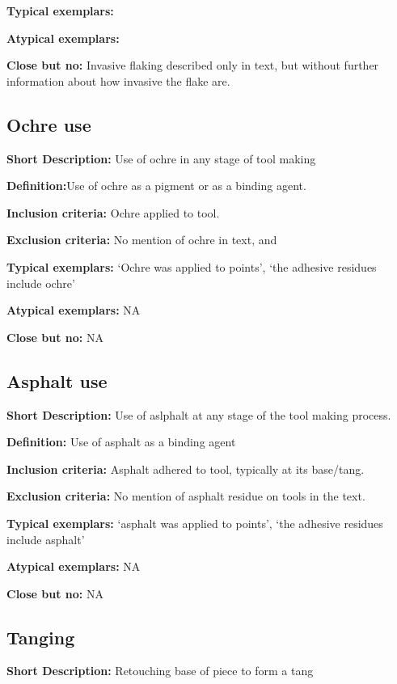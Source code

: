 \documentclass[
]{article}
\begin{document}
\textbf{Typical exemplars:}

\textbf{Atypical exemplars:}

\textbf{Close but no:} Invasive flaking described only in text, but
without further information about how invasive the flake are.

\hypertarget{ochre-use}{%
\subsection{Ochre use}\label{ochre-use}}

\textbf{Short Description:} Use of ochre in any stage of tool making

\textbf{Definition:}Use of ochre as a pigment or as a binding agent.

\textbf{Inclusion criteria:} Ochre applied to tool.

\textbf{Exclusion criteria:} No mention of ochre in text, and

\textbf{Typical exemplars:} `Ochre was applied to points', `the adhesive
residues include ochre'

\textbf{Atypical exemplars:} NA

\textbf{Close but no:} NA

\hypertarget{asphalt-use}{%
\subsection{Asphalt use}\label{asphalt-use}}

\textbf{Short Description:} Use of aslphalt at any stage of the tool
making process.

\textbf{Definition:} Use of asphalt as a binding agent

\textbf{Inclusion criteria:} Asphalt adhered to tool, typically at its
base/tang.

\textbf{Exclusion criteria:} No mention of asphalt residue on tools in
the text.

\textbf{Typical exemplars:} `asphalt was applied to points', `the
adhesive residues include asphalt'

\textbf{Atypical exemplars:} NA

\textbf{Close but no:} NA

\hypertarget{tanging}{%
\subsection{Tanging}\label{tanging}}

\textbf{Short Description:} Retouching base of piece to form a tang
\end{document}
